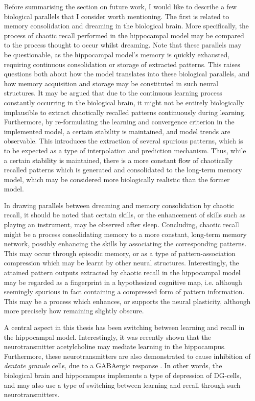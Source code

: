 Before summarising the section on future work, I would like to describe a few biological parallels that I consider worth mentioning. The first is related to memory consolidation and dreaming in the biological brain. More specifically, the process of chaotic recall performed in the hippocampal model may be compared to the process thought to occur whilst dreaming. Note that these parallels may be questionable, as the hippocampal model's memory is quickly exhausted, requiring continuous consolidation or storage of extracted patterns. This raises questions both about how the model translates into these biological parallels, and how memory acquisition and storage may be constituted in such neural structures.
It may be argued that due to the continuous learning process constantly occurring in the biological brain, it might not be entirely biologically implausible to extract chaotically recalled patterns continuously during learning. Furthermore, by re-formulating the learning and convergence criterion in the implemented model, a certain stability is maintained, and model trends are observable. This introduces the extraction of several spurious patterns, which is to be expected as a type of interpolation and prediction mechanism. Thus, while a certain stability is maintained, there is a more constant flow of chaotically recalled patterns which is generated and consolidated to the long-term memory model, which may be considered more biologically realistic than the former model.

In drawing parallels between dreaming and memory consolidation by chaotic recall, it should be noted that certain skills, or the enhancement of skills such as playing an instrument, may be observed after sleep. Concluding, chaotic recall might be a process consolidating memory to a more constant, long-term memory network, possibly enhancing the skills by associating the corresponding patterns. This may occur through episodic memory, or as a type of pattern-association compression which may be learnt by other neural structures. Interestingly, the attained pattern outputs extracted by chaotic recall in the hippocampal model may be regarded as a fingerprint in a hypothesized cognitive map, i.e. although seemingly spurious in fact containing a compressed form of pattern information.
This may be a process which enhances, or supports the neural plasticity, although more precisely how remaining slightly obscure.

A central aspect in this thesis has been switching between learning and recall in the hippocampal model. Interestingly, it was recently shown that the neurotransmitter acetylcholine may mediate learning in the hippocampus. Furthermore, these neurotransmitters are also demonstrated to cause inhibition of \textit{dentate granule} cells, due to a GABAergic response \citep{Pabst2016}. In other words, the biological brain and hippocampus implements a type of depression of DG-cells, and may also use a type of switching between learning and recall through such neurotransmitters.

